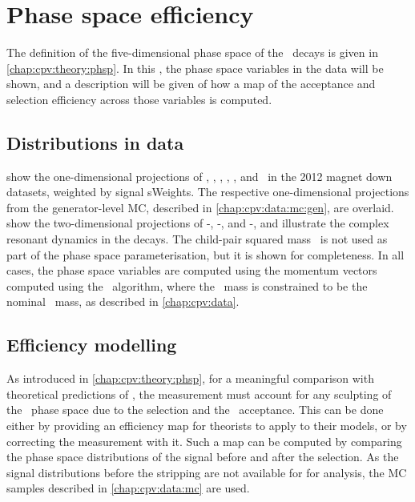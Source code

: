 \chapter{Phase space efficiency}
\label{chap:cpv:phsp}

The definition of the five-dimensional phase space of the \LcTophh\ decays is 
given in \cref{chap:cpv:theory:phsp}.
In this , the phase space variables in the data will be 
shown, and a description will be given of how a map of the acceptance and 
selection efficiency across those variables is computed.

\section{Distributions in data}
\label{chap:cpv:phsp:data}

 show the 
one-dimensional projections of \msqphm, \msqphp, \msqhh, \thetap, \phip, and 
\phihh\ in the 2012 magnet down datasets, weighted by signal sWeights.
The respective one-dimensional projections from the generator-level \ac{MC}, 
described in \cref{chap:cpv:data:mc:gen}, are overlaid.
 show the 
two-dimensional projections of \msqphp-\msqhh, \msqphm-\msqphp, and 
\msqphp-\msqhh, and illustrate the complex resonant dynamics in the decays.
The child-pair squared mass \msqphp\ is not used as part of the phase space 
parameterisation, but it is shown for completeness.
In all cases, the phase space variables are computed using the momentum vectors 
computed using the \decaytreefitter\ algorithm, where the \phh\ mass is 
constrained to be the nominal \PLambdac\ mass, as described in 
\cref{chap:cpv:data}.

\section{Efficiency modelling}
\label{sec:phsp:eff}

As introduced in \cref{chap:cpv:theory:phsp}, for a meaningful comparison with 
theoretical predictions of \dACP, the measurement must account for any 
sculpting of the \PLambdac\ phase space due to the selection and the \lhcb\ 
acceptance.
This can be done either by providing an efficiency map for theorists to apply 
to their models, or by correcting the measurement with it.
Such a map can be computed by comparing the phase space distributions of the 
signal before and after the selection.
As the signal distributions before the stripping are not available for for 
analysis, the \ac{MC} samples described in \cref{chap:cpv:data:mc} are used.

